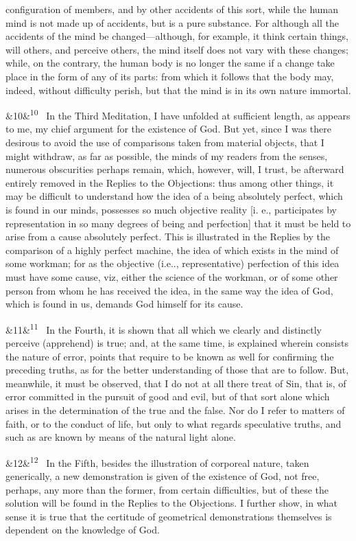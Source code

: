 \documentclass[12pt]{article}
\newcommand{\para}[1][]{\par\noindent\ifx&#1&\else\textsuperscript{\footnotesize #1}~\fi}
\begin{document}
configuration of members, and by other accidents of this sort, while the human mind is not made up of accidents, but is a pure substance. For although all the accidents of the mind be changed---although, for example, it think certain things, will others, and perceive others, the mind itself does not vary with these changes; while, on the contrary, the human body is no longer the same if a change take place in the form of any of its parts: from which it follows that the body may, indeed, without difficulty perish, but that the mind is in its own nature immortal.

\para[10] In the Third Meditation, I have unfolded at sufficient length, as appears to me, my chief argument for the existence of God. But yet, since I was there desirous to avoid the use of comparisons taken from material objects, that I might withdraw, as far as possible, the minds of my readers from the senses, numerous obscurities perhaps remain, which, however, will, I trust, be afterward entirely removed in the Replies to the Objections: thus among other things, it may be difficult to understand how the idea of a being absolutely perfect, which is found in our minds, possesses so much objective reality [i. e., participates by representation in so many degrees of being and perfection] that it must be held to arise from a cause absolutely perfect. This is illustrated in the Replies by the comparison of a highly perfect machine, the idea of which exists in the mind of some workman; for as the objective (i.e.., representative) perfection of this idea must have some cause, viz, either the science of the workman, or of some other person from whom he has received the idea, in the same way the idea of God, which is found in us, demands God himself for its cause.

\para[11] In the Fourth, it is shown that all which we clearly and distinctly perceive (apprehend) is true; and, at the same time, is explained wherein consists the nature of error, points that require to be known as well for confirming the preceding truths, as for the better understanding of those that are to follow. But, meanwhile, it must be observed, that I do not at all there treat of Sin, that is, of error committed in the pursuit of good and evil, but of that sort alone which arises in the determination of the true and the false. Nor do I refer to matters of faith, or to the conduct of life, but only to what regards speculative truths, and such as are known by means of the natural light alone.

\para[12] In the Fifth, besides the illustration of corporeal nature, taken generically, a new demonstration is given of the existence of God, not free, perhaps, any more than the former, from certain difficulties, but of these the solution will be found in the Replies to the Objections. I further show, in what sense it is true that the certitude of geometrical demonstrations themselves is dependent on the knowledge of God.
\end{document}
